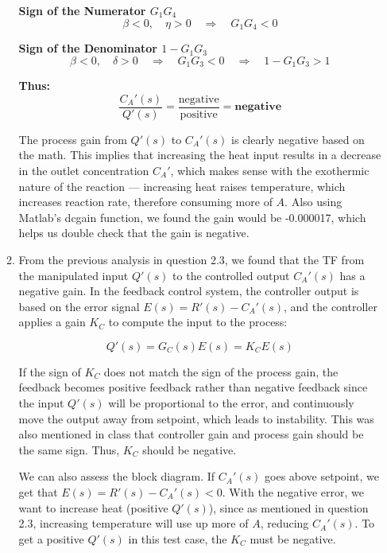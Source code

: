 \documentclass[12pt]{article}
\begin{document}
\begin{enumerate}
\begin{enumerate}
    \medskip
    
    \noindent\textbf{Sign of the Numerator \(G_1 G_4\)}  
    \[
    \beta < 0, \quad \eta > 0 \quad \Rightarrow \quad G_1 G_4 < 0
    \]
    
    \noindent\textbf{Sign of the Denominator \(1 - G_1 G_3\)}  
    \[
    \beta < 0, \quad \delta > 0 \quad \Rightarrow \quad G_1 G_3 < 0 \quad \Rightarrow \quad 1 - G_1 G_3 > 1
    \]
    
    \noindent\textbf{Thus:}
    \[
    \frac{C_A'(s)}{Q'(s)} = \frac{\text{negative}}{\text{positive}} = \textbf{negative}
    \]
    
    \medskip
    
    \noindent The process gain from \(Q'(s)\) to \(C_A'(s)\) is clearly negative based on the math. This implies that increasing the heat input results in a decrease in the outlet concentration \(C_A'\), which makes sense with the exothermic nature of the reaction — increasing heat raises temperature, which increases reaction rate, therefore consuming more of \(A\). Also using Matlab's dcgain function, we found the gain would be -0.000017, which helps us double check that the gain is negative.

    \item From the previous analysis in question 2.3, we found that the TF from the manipulated input \(Q'(s)\) to the controlled output \(C_A'(s)\) has a negative gain. In the feedback control system, the controller output is based on the error signal \(E(s) = R'(s) - C_A'(s)\), and the controller applies a gain \(K_C\) to compute the input to the process:
    
    \[
    Q'(s) = G_C(s) E(s) = K_C E(s)
    \]
    
    If the sign of \(K_C\) does not match the sign of the process gain, the feedback becomes positive feedback rather than negative feedback since the input \(Q'(s)\) will be proportional to the error, and continuously move the output away from setpoint, which leads to instability. This was also mentioned in class that controller gain and process gain should be the same sign. Thus, \(K_C\) should be negative.

    \medskip

    We can also assess the block diagram. If \(C_A'(s)\) goes above setpoint, we get that \(E(s) = R'(s) - C_A'(s) < 0\). With the negative error, we want to increase heat (positive \(Q'(s)\)), since as mentioned in question 2.3, increasing temperature will use up more of \(A\), reducing \(C_A'(s)\). To get a positive \(Q'(s)\) in this test case, the \(K_C\) must be negative.


\end{enumerate}
\end{enumerate}
\end{document}
